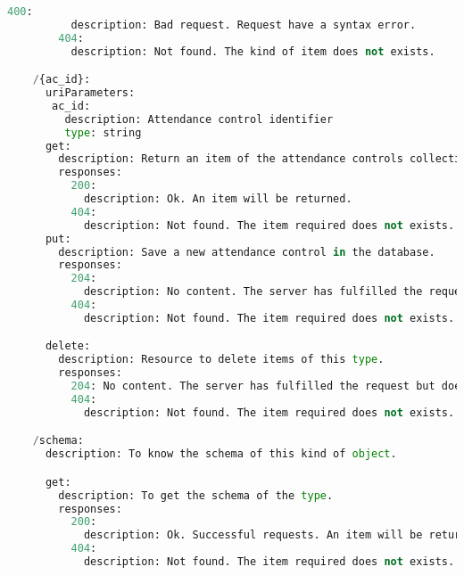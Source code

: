\begin{lstlisting}[language=python,frame=none]
        400:
          description: Bad request. Request have a syntax error.
        404:
          description: Not found. The kind of item does not exists.

    /{ac_id}:
      uriParameters:
       ac_id:
         description: Attendance control identifier
         type: string
      get:
        description: Return an item of the attendance controls collection.
        responses:
          200:
            description: Ok. An item will be returned.
          404:
            description: Not found. The item required does not exists.
      put:
        description: Save a new attendance control in the database.
        responses:
          204:
            description: No content. The server has fulfilled the request but does not need to return an entity-body.
          404:
            description: Not found. The item required does not exists.

      delete:
        description: Resource to delete items of this type.
        responses:
          204: No content. The server has fulfilled the request but does not need to return an entity-body.
          404:
            description: Not found. The item required does not exists.

    /schema:
      description: To know the schema of this kind of object.

      get:
        description: To get the schema of the type.
        responses:
          200:
            description: Ok. Successful requests. An item will be returned.
          404:
            description: Not found. The item required does not exists.

\end{lstlisting}



